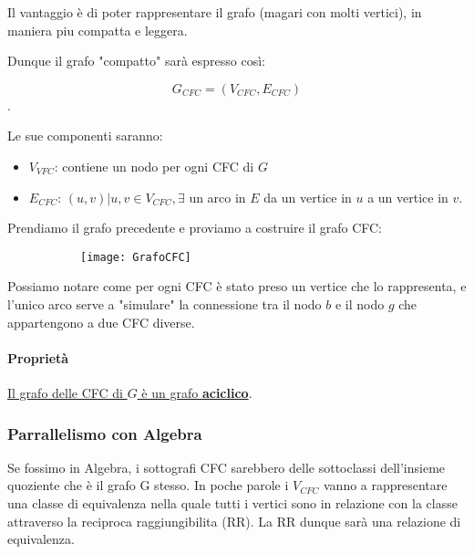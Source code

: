 Il vantaggio è di poter rappresentare il grafo (magari con molti vertici), in maniera piu compatta e leggera.\bigskip

Dunque il grafo "compatto" sarà espresso così:

$$G_{CFC} = (V_{CFC}, E_{CFC})$$.

Le sue componenti saranno:\medskip

\begin{itemize}
    \item $V_{VFC}$: contiene un nodo per ogni CFC di $G$
    \item $E_{CFC}$: $(u,v)| u,v \in V_{CFC}, \exists $ un arco in $E$ da un vertice in $u$ a un vertice in $v$.
\end{itemize}\bigskip

Prendiamo il grafo precedente e proviamo a costruire il grafo CFC:

\begin{figure}[H]
    \centering
    \begin{subfigure}[b]{0.75\textwidth}
        \texttt{[image: GrafoCFC]} 
    \end{subfigure}
\end{figure}\smallskip

Possiamo notare come per ogni CFC è stato preso un vertice che lo rappresenta, e l'unico arco serve a "simulare" la connessione tra il nodo $b$ e il nodo $g$ che appartengono a due CFC diverse.

\paragraph{Proprietà} \underline{Il grafo delle CFC di $G$ è un grafo \textbf{aciclico}}.



\subsubsection{Parrallelismo con Algebra}
Se fossimo in Algebra, i sottografi CFC sarebbero delle sottoclassi dell'insieme quoziente che è il grafo G stesso. In poche parole i $V_{CFC}$ vanno a rappresentare una classe di equivalenza nella quale tutti i vertici sono in relazione con la classe attraverso la reciproca raggiungibilita (RR).
La RR dunque sarà una relazione di equivalenza.

